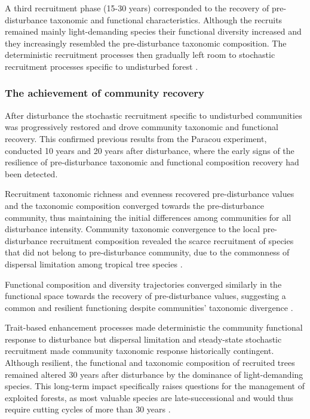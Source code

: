 \documentclass[
  11pt,
  french,
  A4paper,
  extrafontsizes,onecolumn,openright
  ]{memoir}
\begin{document}
A third recruitment phase (15-30 years) corresponded to the recovery of
pre-disturbance taxonomic and functional characteristics. Although the
recruits remained mainly light-demanding species their functional
diversity increased and they increasingly resembled the pre-disturbance
taxonomic composition. The deterministic recruitment processes then
gradually left room to stochastic recruitment processes specific to
undisturbed forest \autocites{Lawton1988}{Chave2004}.

\subsubsection{The achievement of community
recovery}\label{the-achievement-of-community-recovery}

After disturbance the stochastic recruitment specific to undisturbed
communities was progressively restored and drove community taxonomic and
functional recovery. This confirmed previous results from the Paracou
experiment, conducted 10 years \autocite{Molino2001} and 20 years
\autocite{Baraloto2012} after disturbance, where the early signs of the
resilience of pre-disturbance taxonomic and functional composition
recovery had been detected.

Recruitment taxonomic richness and evenness recovered pre-disturbance
values and the taxonomic composition converged towards the
pre-disturbance community, thus maintaining the initial differences
among communities for all disturbance intensity. Community taxonomic
convergence to the local pre-disturbance recruitment composition
revealed the scarce recruitment of species that did not belong to
pre-disturbance community, due to the commonness of dispersal limitation
among tropical tree species \autocite{Svenning2005}.

Functional composition and diversity trajectories converged similarly in
the functional space towards the recovery of pre-disturbance values,
suggesting a common and resilient functioning despite communities'
taxonomic divergence \autocite{Fukami2005}.

Trait-based enhancement processes made deterministic the community
functional response to disturbance but dispersal limitation and
steady-state stochastic recruitment made community taxonomic response
historically contingent. Although resilient, the functional and
taxonomic composition of recruited trees remained altered 30 years after
disturbance by the dominance of light-demanding species. This long-term
impact specifically raises questions for the management of exploited
forests, as most valuable species are late-successional and would thus
require cutting cycles of more than 30 years \autocite{Putz2012}.
\end{document}
